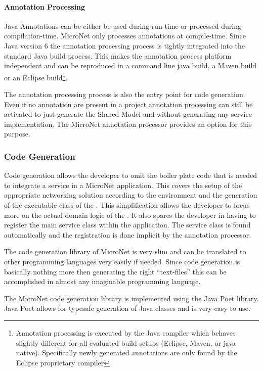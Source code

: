 \paragraph{Annotation Processing}
 
Java Annotations can be either be used during run-time or processed during
compilation-time. MicroNet only processes annotations at compile-time. Since
Java version 6 the annotation processing process is tightly integrated into the
standard Java build process. This makes the annotation process platform
independent and can be reproduced in a command line java build, a Maven build or
an Eclipse build\footnote{Annotation processing is executed by the Java compiler
which behaves slightly different for all evaluated build setups (Eclipse, Maven,
or java native). Specifically newly generated annotations are only found by the
Eclipse proprietary compiler}.

The annotation processing process is also the entry point for code generation.
Even if no annotation are present in a project annotation processing can
still be activated to just generate the Shared Model and without generating any
service implementation. The MicroNet annotation processor provides an option for
this purpose.

\subsubsection{Code Generation}

Code generation allows the developer to omit the boiler plate code that is
needed to integrate a service in a MicroNet application. This covers the setup
of the appropriate networking solution according to the environment and the
generation of the executable class of the \ms{}. This simplification allows the
developer to focus more on the actual domain logic of the \ms{}. It also spares
the developer in having to register the main service class within the
application. The service class is found automatically and the registration is
done implicit by the annotation processor.

The code generation library of MicroNet is very slim and can be translated to
other programming languages very easily if needed. Since code generation is
basically nothing more then generating the right ``text-files'' this can be
accomplished in almost any imaginable programming language.

The MicroNet code generation library is implemented using the Java Poet
library. Java Poet allows for typesafe generation of Java classes and is very
easy to use. 

